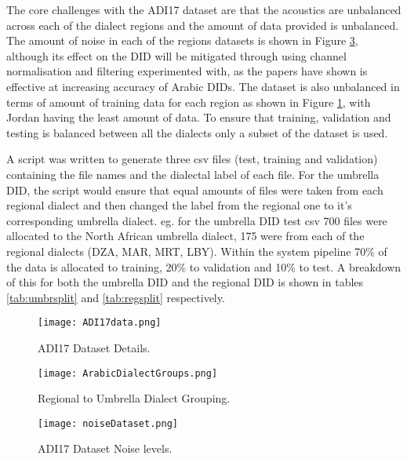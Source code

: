 The core challenges with the ADI17 dataset are that the acoustics are unbalanced across each of the dialect regions and the amount of data provided is unbalanced. The amount of noise in each of the 
regions datasets is shown in Figure \ref{fig:noiseDataSet}, although its effect on the DID will be mitigated through using channel normalisation and filtering experimented with, as the papers \cite{boril_arabic_2012,pohjalainen_spectral_2016} have shown is effective at increasing 
accuracy of Arabic DIDs. The dataset is also unbalanced in terms of amount of training data for each region as shown in Figure \ref{fig:ADI17}, with Jordan having the least amount of data. To ensure that 
training, validation and testing is balanced between all the dialects only a subset of the dataset is used. 

A script was written to generate three csv files (test, training and validation) containing the file names and the dialectal label of each file. 
For the umbrella DID, the script would ensure that equal amounts of files were taken from each regional dialect and then changed the label from the regional one 
to it's corresponding umbrella dialect. eg. for the umbrella DID test csv 700 files were allocated to the North African umbrella dialect, 175 were from each of the regional dialects (DZA, MAR, MRT, LBY). 
Within the system pipeline 70\% of the data is allocated to training, 20\% to validation and 10\% to test. A breakdown of this for both the umbrella DID and the regional DID is shown in tables \ref{tab:umbrsplit} and \ref{tab:regsplit}
respectively. 

\begin{figure}[h!]
    \centering
    \texttt{[image: ADI17data.png]}
    \caption{ADI17 Dataset Details.}
    \label{fig:ADI17}
\end{figure}

\begin{figure}[h!]
    \centering
    \texttt{[image: ArabicDialectGroups.png]}
    \caption{Regional to Umbrella Dialect Grouping.}
    \label{fig:DialectSplit}
\end{figure}

\begin{figure}[h!]
    \centering
    \texttt{[image: noiseDataset.png]}
    \caption{ADI17 Dataset Noise levels. \cite{alhakeem_confidence_2021}}
    \label{fig:noiseDataSet}
\end{figure}

